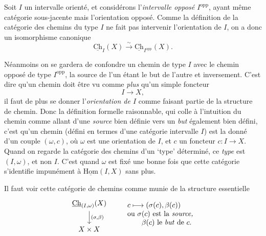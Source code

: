 \documentclass[11pt]{article}
\newcommand{\printedpage}[1]{\if\relax\detokenize{#1}\relax\else\marginpar{\raggedright\footnotesize p.~#1}\fi}
\newcommand{\msp}[1]{\marginpar{\raggedright\footnotesize [#1]}}
\newcommand{\Ch}{\underline{\mathrm{Ch}}}
\newcommand{\uHom}{\underline{\mathrm{Hom}}}
\newcommand{\opp}{\mathrm{opp}}
\begin{document}
Soit $I$ un intervalle orienté, et considérons l'\textit{intervalle opposé $I^{\opp}$}, ayant même catégorie sous-jacente mais l'orientation opposé. Comme la définition de la catégorie des chemins du type $I$ ne fait pas intervenir l'orientation de $I$, on a donc un isomorphisme canonique %
\[
\Ch_I(X) \xrightarrow{\sim} \Ch_{I^{\opp}}(X).
\]

\msp{page 17}

Néanmoins on se gardera de confondre un chemin de type $I$ avec le chemin opposé de type $I^{\opp}$, la source de l'un étant le but de l'autre et inversement. C'est dire qu'un chemin doit être vu comme \textit{plus} qu'un simple foncteur
\[
I \longrightarrow X,
\]
il faut de plus se donner l'\textit{orientation de $I$} comme faisant partie de la structure de chemin. Donc la définition formelle raisonnable, qui colle à l'intuition du chemin comme allant d'une \textit{source} bien définie vers un \textit{but} également bien défini, c'est qu'un chemin (défini en termes d'une catégorie intervalle $I$) est la donné d'un couple $(\omega,c)$, où $\omega$ est une orientation de $I$, et $c$ un foncteur $c : I \longrightarrow X$. Quand on regarde la catégorie des chemins d'un `type' déterminé, ce \textit{type} est $(I,\omega)$, et non $I$. C'est quand $\omega$ est fixé une bonne fois que cette catégorie s'identifie impunément à $\uHom(I,X)$ sans plus. %

Il faut voir cette catégorie de chemins comme munie de la structure essentielle
\[
\begin{tikzcd}
\Ch_{(I,\omega)}(X) \arrow[d, "{(\sigma,\beta)}"] \\
X \times X
\end{tikzcd}
\qquad
\begin{array}{l}
c \longmapsto (\sigma(c),\beta(c)) \\
\text{ou $\sigma(c)$ est la \textit{source,}} \\
\qquad \text{$\beta(c)$ le \textit{but} de $c$.}
\end{array} %
\]

\printedpage{12}

\msp{page 18}
\end{document}
